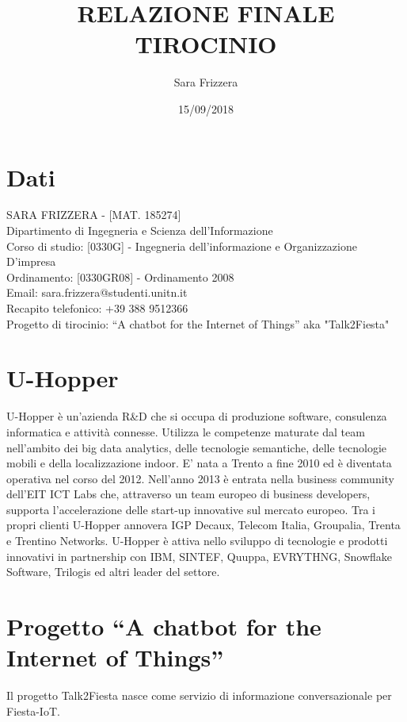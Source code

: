 \documentclass[a4paper,11pt]{article}
\theoremstyle{plain}
\begin{document}
\title{\huge RELAZIONE FINALE TIROCINIO}
\author{Sara Frizzera}
\date{15/09/2018}
\maketitle

\section*{Dati}
SARA FRIZZERA - [MAT. 185274]\\
Dipartimento di Ingegneria e Scienza dell’Informazione\\
Corso di studio:	[0330G] - Ingegneria dell'informazione e Organizzazione D'impresa\\
Ordinamento: [0330GR08] - Ordinamento 2008\\
Email: sara.frizzera@studenti.unitn.it\\
Recapito telefonico: +39 388 9512366\\
Progetto di tirocinio: “A chatbot for the Internet of Things” aka "Talk2Fiesta"

\section*{U-Hopper}
U-Hopper è un'azienda R\&D che si occupa di produzione software, consulenza informatica e attività connesse.
Utilizza le competenze maturate dal team nell’ambito dei big data analytics, delle tecnologie semantiche, delle tecnologie mobili e della localizzazione indoor.
E' nata a Trento a fine 2010 ed è diventata operativa nel corso del 2012. Nell’anno 2013 è entrata nella business community dell’EIT ICT Labs che, attraverso un team europeo di business developers, supporta l'accelerazione delle start-up innovative sul mercato europeo.
Tra i propri clienti U-Hopper annovera IGP Decaux, Telecom Italia, Groupalia, Trenta e Trentino Networks. U-Hopper è attiva nello sviluppo di tecnologie e prodotti innovativi in partnership con IBM, SINTEF, Quuppa, EVRYTHNG, Snowflake Software, Trilogis ed altri leader del settore.

\section*{Progetto “A chatbot for the Internet of Things”}

Il progetto Talk2Fiesta nasce come servizio di informazione conversazionale per Fiesta-IoT.
\end{document}
